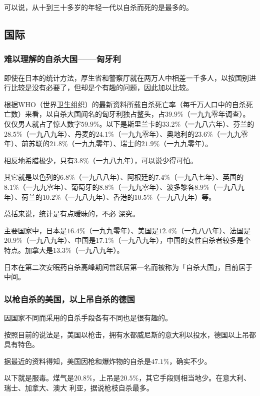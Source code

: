 \documentclass[UTF8]{ctexart}
\begin{document}
可以说，从十到三十多岁的年轻一代以自杀而死的是最多的。

\subsection{国际}

\subsubsection*{难以理解的自杀大国——匈牙利}

即使在日本的统计方法，厚生省和警察厅就在两万人中相差一千多人，以按国别进行比较是没有必要了，但却是个有趣的问题，因此加以比较。

根据WHO（世界卫生组织）的最新资料所载自杀死亡率（每千万人口中的自杀死亡数）来看，以自杀大国闻名的匈牙利独占鳌头，占$39.9\%$（一九九零年调查）。仅仅男人就占了惊人数字$59.9\%$。以下是斯里兰卡的$33.2\%$（一九八六年）、芬兰的$28.5\%$（一九八九年）、丹麦的$24.1\%$（一九九零年）、奥地利的$23.6\%$（一九九零年）、前苏联的$21.8\%$（一九九零年）、瑞士的$21.9\%$（一九九零年）。

相反地希腊极少，只有$3.8\%$（一九八九年），可以说少得可怕。

其它就是以色列的$6.8\%$（一九八八年）、阿根廷的$7.4\%$（一九八七年）、英国的$8.1\%$（一九九零年）、葡萄牙的$8.8\%$（一九九零年）、波多黎各$8.9\%$（一九八九年）、荷兰的$10.2\%$（一九八九年）、香港的$10.5\%$（一九八九年）等。

总括来说，统计是有点暧昧的，不必 深究。

主要国家中，日本是$16.4\%$（一九九零年）、美国是$12.4\%$（一九八八年）、法国是 $20.9\%$（一九八九年）、中国是$17.1\%$（一九八九年），中国的女性自杀者较多是个 特点。加拿大是$13.3\%$（一九八九年）。

日本在第二次安眠药自杀高峰期间曾跃居第一名而被称为「自杀大国」，目前居于中间。

\subsubsection*{以枪自杀的美国，以上吊自杀的德国}

因国家不同而采用的自杀手段各有不同也是很有趣的。

按照目前的说法是，美国以枪击，拥有水都威尼斯的意大利以投水，德国以上吊都具有特色。

据最近的资料得知，美国因枪和爆炸物的自杀是$47.1\%$，确实不少。

以下就是服毒。煤气是$20.8\%$，上吊是$20.5\%$，其它手段则相当地少。在意大利、瑞士、加拿大、澳大 利亚，据说枪枝自杀最多。
\end{document}
